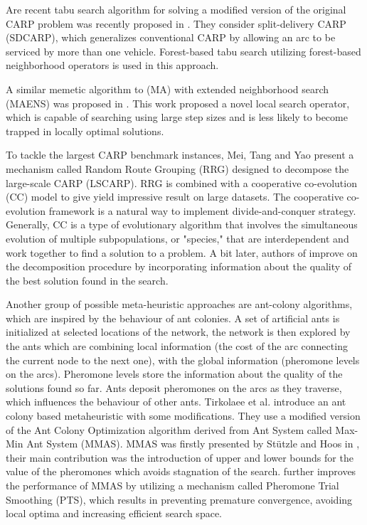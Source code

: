 \documentclass[twoside]{ctuthesis}
\theoremstyle{plain}
\theoremstyle{definition}
\theoremstyle{note}
\begin{document}
Are recent tabu search algorithm for solving a modified version of the original CARP problem was recently proposed in \cite{lai2018forest}. They consider split-delivery CARP (SDCARP), which generalizes conventional CARP by allowing an arc to be serviced by more than one vehicle. Forest-based tabu search utilizing forest-based neighborhood operators is used in this approach.

A similar memetic algorithm to (MA) with extended neighborhood search (MAENS) was proposed in \cite{tang2009memetic}. This work proposed a novel local search operator, which is capable of searching using large step sizes and is less likely to become trapped in locally optimal solutions.

To tackle the largest CARP benchmark instances, Mei, Tang and Yao \cite{mei2013decomposing} present a mechanism called Random Route Grouping (RRG) designed to decompose the large-scale CARP (LSCARP). RRG is combined with a cooperative co-evolution (CC) model to give yield impressive result on large datasets. The cooperative co-evolution framework is a natural way to implement divide-and-conquer strategy. Generally, CC is a type of evolutionary algorithm that involves the simultaneous evolution of multiple subpopulations, or "species," that are interdependent and work together to find a solution to a problem. A bit later, authors of \cite{mei2014variable} improve on the decomposition procedure by incorporating information about the quality of the best solution found in the search.

Another group of possible meta-heuristic approaches are ant-colony algorithms, which are inspired by the behaviour of ant colonies. A set of artificial ants is initialized at selected locations of the network, the network is then explored by the ants which are combining local information (the cost of the arc connecting the current node to the next one), with the global information (pheromone levels on the arcs). Pheromone levels store the information about the quality of the solutions found so far. Ants deposit pheromones on the arcs as they traverse, which influences the behaviour of other ants. 
Tirkolaee et al. \cite{TIRKOLAEE2019457} introduce an ant colony based metaheuristic with some modifications. They use a modified version of the Ant Colony Optimization algorithm derived from Ant System called Max-Min Ant System (MMAS). MMAS was firstly presented by Stützle and Hoos in \cite{stutzle2000max}, their main contribution was the introduction of upper and lower bounds for the value of the pheromones which avoids stagnation of the search. \cite{TIRKOLAEE2019457} further improves the performance of MMAS by utilizing a mechanism called Pheromone Trial Smoothing (PTS), which results in preventing premature convergence, avoiding local optima and increasing efficient search space.
\end{document}
